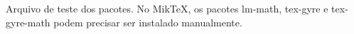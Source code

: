 \documentclass{article}
\begin{document}
Arquivo de teste dos pacotes.
No MikTeX, os pacotes lm-math, tex-gyre e tex-gyre-math podem precisar ser instalado manualmente.
\end{document}
